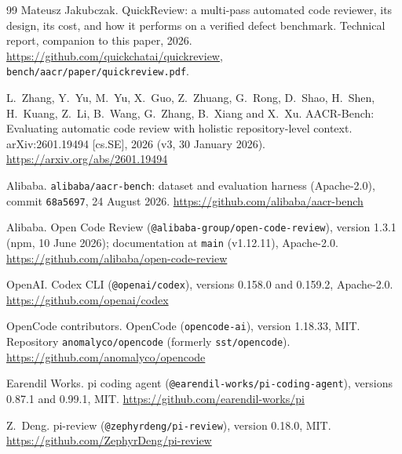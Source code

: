 \documentclass[11pt,a4paper]{article}
\newcommand{\code}[1]{\texttt{#1}}
\begin{document}
\small
\begin{thebibliography}{99}
Mateusz Jakubczak.
\newblock QuickReview: a multi-pass automated code reviewer, its design, its cost, and how it performs on a verified defect benchmark.
\newblock Technical report, companion to this paper, 2026.
\newblock \url{https://github.com/quickchatai/quickreview}, \code{bench/aacr/paper/quickreview.pdf}. %


L.~Zhang, Y.~Yu, M.~Yu, X.~Guo, Z.~Zhuang, G.~Rong, D.~Shao, H.~Shen,
H.~Kuang, Z.~Li, B.~Wang, G.~Zhang, B.~Xiang and X.~Xu.
\newblock AACR-Bench: Evaluating automatic code review with holistic
repository-level context.
\newblock arXiv:2601.19494 [cs.SE], 2026 (v3, 30 January 2026).
\newblock \url{https://arxiv.org/abs/2601.19494}

Alibaba.
\newblock \texttt{alibaba/aacr-bench}: dataset and evaluation harness
(Apache-2.0), commit \texttt{68a5697}, 24 August 2026.
\newblock \url{https://github.com/alibaba/aacr-bench}

Alibaba.
\newblock Open Code Review (\texttt{@alibaba-group/open-code-review}),
version 1.3.1 (npm, 10 June 2026); documentation at \texttt{main}
(v1.12.11), Apache-2.0.
\newblock \url{https://github.com/alibaba/open-code-review}

OpenAI.
\newblock Codex CLI (\texttt{@openai/codex}), versions 0.158.0 and 0.159.2,
Apache-2.0.
\newblock \url{https://github.com/openai/codex}

OpenCode contributors.
\newblock OpenCode (\texttt{opencode-ai}), version 1.18.33, MIT.
Repository \texttt{anomalyco/opencode} (formerly \texttt{sst/opencode}).
\newblock \url{https://github.com/anomalyco/opencode}

Earendil Works.
\newblock pi coding agent (\texttt{@earendil-works/pi-coding-agent}),
versions 0.87.1 and 0.99.1, MIT.
\newblock \url{https://github.com/earendil-works/pi}

Z.~Deng.
\newblock pi-review (\texttt{@zephyrdeng/pi-review}), version 0.18.0, MIT.
\newblock \url{https://github.com/ZephyrDeng/pi-review}


\end{thebibliography}
\end{document}
